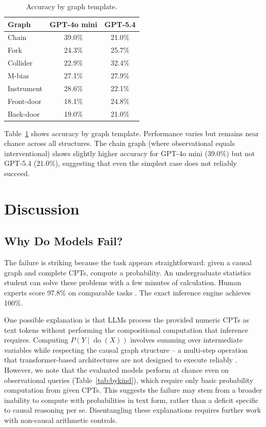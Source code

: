 \documentclass[11pt,a4paper]{article}
\begin{document}
\begin{table}[h]
\centering
\caption{Accuracy by graph template.}
\label{tab:bygraph}
\begin{tabular}{lcc}
\toprule
\textbf{Graph} & \textbf{GPT-4o mini} & \textbf{GPT-5.4} \\
\midrule
Chain & 39.0\% & 21.0\% \\
Fork & 24.3\% & 25.7\% \\
Collider & 22.9\% & 32.4\% \\
M-bias & 27.1\% & 27.9\% \\
Instrument & 28.6\% & 22.1\% \\
Front-door & 18.1\% & 24.8\% \\
Back-door & 19.0\% & 21.0\% \\
\bottomrule
\end{tabular}
\end{table}

Table~\ref{tab:bygraph} shows accuracy by graph template. Performance varies but remains near chance across all structures. The chain graph (where observational equals interventional) shows slightly higher accuracy for GPT-4o mini (39.0\%) but not GPT-5.4 (21.0\%), suggesting that even the simplest case does not reliably succeed.

\section{Discussion}

\subsection{Why Do Models Fail?}

The failure is striking because the task appears straightforward: given a causal graph and complete CPTs, compute a probability. An undergraduate statistics student can solve these problems with a few minutes of calculation. Human experts score 97.8\% on comparable tasks \cite{counterbench}. The exact inference engine achieves 100\%.

One possible explanation is that LLMs process the provided numeric CPTs as text tokens without performing the compositional computation that inference requires. Computing $P(Y \mid \operatorname{do}(X))$ involves summing over intermediate variables while respecting the causal graph structure -- a multi-step operation that transformer-based architectures are not designed to execute reliably \cite{thomm2024limits,dziri2024faithful}. However, we note that the evaluated models perform at chance even on observational queries (Table~\ref{tab:bykind}), which require only basic probability computation from given CPTs. This suggests the failure may stem from a broader inability to compute with probabilities in text form, rather than a deficit specific to causal reasoning per se. Disentangling these explanations requires further work with non-causal arithmetic controls.
\end{document}
